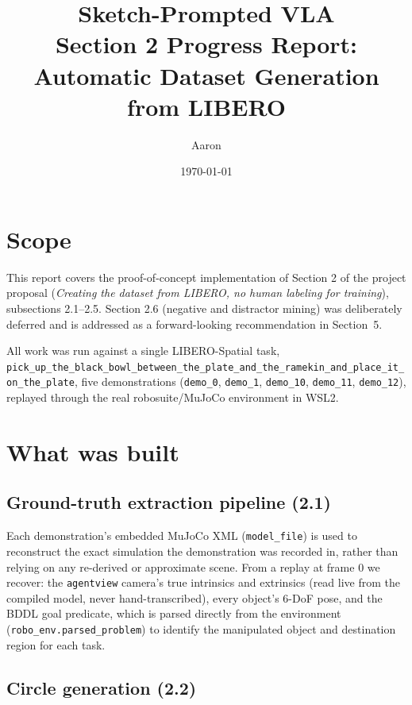 \documentclass[11pt]{article}
\title{Sketch-Prompted VLA \\ \large Section 2 Progress Report: Automatic Dataset Generation from LIBERO}
\author{Aaron}
\date{\today}
\begin{document}
\maketitle

\section{Scope}

This report covers the proof-of-concept implementation of Section 2 of the project proposal (\emph{Creating the dataset from LIBERO, no human labeling for training}), subsections 2.1--2.5. Section 2.6 (negative and distractor mining) was deliberately deferred and is addressed as a forward-looking recommendation in Section~5.

All work was run against a single LIBERO-Spatial task, \\
\texttt{pick\_\allowbreak up\_\allowbreak the\_\allowbreak black\_\allowbreak bowl\_\allowbreak between\_\allowbreak the\_\allowbreak plate\_\allowbreak and\_\allowbreak the\_\allowbreak ramekin\_\allowbreak and\_\allowbreak place\_\allowbreak it\_\allowbreak on\_\allowbreak the\_\allowbreak plate}, five demonstrations (\texttt{demo\_0}, \texttt{demo\_1}, \texttt{demo\_10}, \texttt{demo\_11}, \texttt{demo\_12}), replayed through the real robosuite/MuJoCo environment in WSL2.

\section{What was built}

\subsection{Ground-truth extraction pipeline (2.1)}

Each demonstration's embedded MuJoCo XML (\texttt{model\_file}) is used to reconstruct the exact simulation the demonstration was recorded in, rather than relying on any re-derived or approximate scene. From a replay at frame 0 we recover: the \texttt{agentview} camera's true intrinsics and extrinsics (read live from the compiled model, never hand-transcribed), every object's 6-DoF pose, and the BDDL goal predicate, which is parsed directly from the environment (\texttt{robo\_env.parsed\_problem}) to identify the manipulated object and destination region for each task.

\subsection{Circle generation (2.2)}
\end{document}

